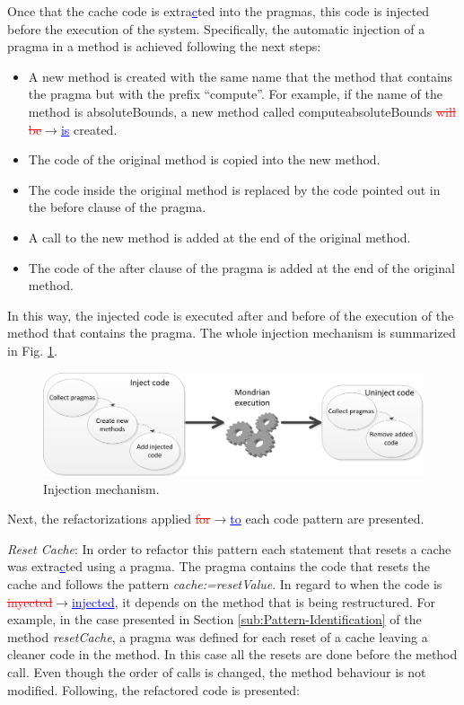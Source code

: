 \documentclass[runningheads]{llncs}
\newcommand{\ra}{$\rightarrow$}
\newcommand{\ins}[1]{\textcolor{blue}{\uline{#1}}} %
\newcommand{\chg}[2]{\textcolor{red}{\sout{#1}}{\ra}\textcolor{blue}{\uline{#2}}} %
\begin{document}
Once that the cache code is extra\ins{c}ted into the pragmas, this code is
injected before the execution of the system. Specifically, the automatic
injection of a pragma in a method is achieved following the next steps:
\begin{itemize}
\item A new method is created with the same name that the method that contains
the pragma but with the prefix {}``compute''. For example, if the
name of the method is absoluteBounds, a new method called computeabsoluteBounds
\chg{will be}{is} created.
\item The code of the original method is copied into the new method.
\item The code inside the original method is replaced by the code pointed
out in the before clause of the pragma.
\item A call to the new method is added at the end of the original method.
\item The code of the after clause of the pragma is added at the end of
the original method.
\end{itemize}
In this way, the injected code is executed after and before of the
execution of the method that contains the pragma. The whole injection
mechanism is summarized in Fig. \ref{fig:Injection-mechanism.}. %
\begin{figure}
\begin{centering}
\includegraphics[scale=0.8]{InjectionMechanism}
\par\end{centering}

\caption{Injection mechanism.\label{fig:Injection-mechanism.}}



\end{figure}


Next, the refactorizations applied \chg{for}{to} each code pattern are presented.

\emph{Reset Cache}: In order to refactor this pattern each statement
that resets a cache was extra\ins{c}ted using a pragma. The pragma contains
the code that resets the cache and follows the pattern \emph{cache:=resetValue}.
In regard to when the code is \chg{inyected}{injected}, it depends on the method that
is being restructured. For example, in the case presented in Section
\ref{sub:Pattern-Identification} of the method \emph{resetCache},
a pragma was defined for each reset of a cache leaving a cleaner code
in the method. In this case all the resets are done before the method
call. Even though the order of calls is changed, the method behaviour
is not modified. Following, the refactored code is presented:
\end{document}
